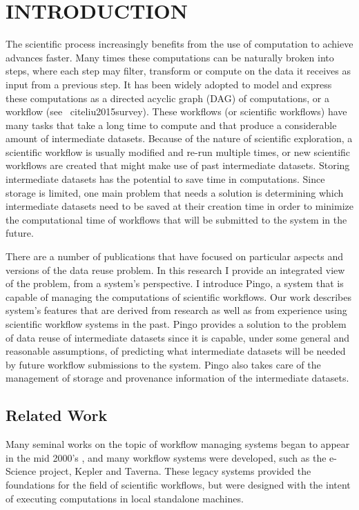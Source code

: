 \chapter{INTRODUCTION}
\label{chap:introduction}
The scientific process increasingly benefits from the use of computation to achieve advances faster. Many times these computations can be naturally broken into steps, where each step may filter, transform or compute on the data it receives as input from a previous step.  It has been widely adopted to model and express these computations as a directed acyclic graph (DAG) of computations, or a workflow (see \
cite{liu2015survey}).  These workflows (or scientific workflows) have many tasks that take a long time to compute and that produce a considerable amount of intermediate datasets.  Because of the nature of scientific exploration, a scientific workflow is usually modified and re-run multiple times, or new scientific workflows are created that might make use of past intermediate datasets.  Storing intermediate datasets has the potential to save time in computations. Since storage is limited, one main problem that needs a solution is determining which intermediate datasets need to be saved at their creation time in order to minimize the computational time of workflows that will be submitted to the system in the future.

There are a number of publications that have focused on particular aspects and versions of the data reuse problem.  In this research I provide an integrated view of the problem, from a system's perspective. I introduce Pingo, a system that is capable of managing the computations of scientific workflows. Our work describes system's features that are derived from research as well as from experience using scientific workflow systems in the past. Pingo provides a solution to the problem of data reuse of intermediate datasets since it is capable, under some general and reasonable assumptions, of predicting what intermediate datasets will be needed by future workflow submissions to the system. Pingo also takes care of the management of storage and provenance information of the intermediate datasets.

\section{Related Work}
Many seminal works on the topic of workflow managing systems began to appear in the mid 2000's \citep[e.g.]{yu2005taxonomy, fox2006special, gil2007examining}, and many workflow systems were developed, such as the e-Science project\citep{deelman2009workflows}, Kepler\citep{altintas2004kepler} and Taverna\citep{oinn2006taverna}. These legacy systems provided the foundations for the field of scientific workflows, but were designed with the intent of executing computations in local standalone machines.

